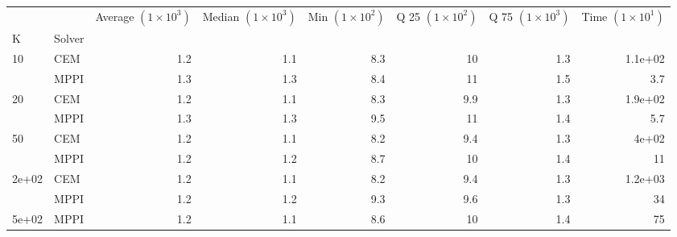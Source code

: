 \documentclass[]{standalone}
\begin{document}
\begin{tabular}{llrrrrrr}
\toprule
      &      &  Average $(1 \times 10^3) $ &  Median $(1 \times 10^3) $ &  Min $(1 \times 10^2) $ &  Q 25 $(1 \times 10^2) $ &  Q 75 $(1 \times 10^3) $ &  Time $(1 \times 10^1) $ \\
K & Solver &                             &                            &                         &                          &                          &                          \\
\midrule
10    & CEM &                         1.2 &                        1.1 &                     8.3 &                       10 &                      1.3 &                  1.1e+02 \\
      & MPPI &                         1.3 &                        1.3 &                     8.4 &                       11 &                      1.5 &                      3.7 \\
20    & CEM &                         1.2 &                        1.1 &                     8.3 &                      9.9 &                      1.3 &                  1.9e+02 \\
      & MPPI &                         1.3 &                        1.3 &                     9.5 &                       11 &                      1.4 &                      5.7 \\
50    & CEM &                         1.2 &                        1.1 &                     8.2 &                      9.4 &                      1.3 &                    4e+02 \\
      & MPPI &                         1.2 &                        1.2 &                     8.7 &                       10 &                      1.4 &                       11 \\
2e+02 & CEM &                         1.2 &                        1.1 &                     8.2 &                      9.4 &                      1.3 &                  1.2e+03 \\
      & MPPI &                         1.2 &                        1.2 &                     9.3 &                      9.6 &                      1.3 &                       34 \\
5e+02 & MPPI &                         1.2 &                        1.1 &                     8.6 &                       10 &                      1.4 &                       75 \\
\bottomrule
\end{tabular}
\end{document}
